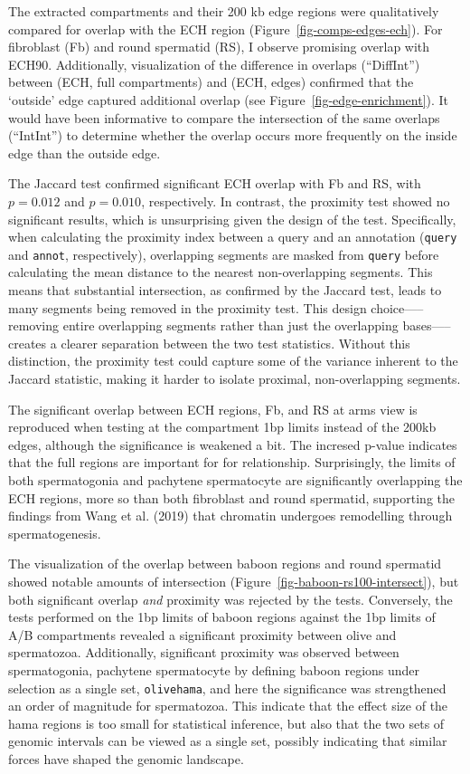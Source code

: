 \documentclass[
  11pt,
  a4paper,
]{scrbook}
\begin{document}
The extracted compartments and their 200 kb edge regions were
qualitatively compared for overlap with the ECH region
(Figure~\ref{fig-comps-edges-ech}). For fibroblast (Fb) and round
spermatid (RS), I observe promising overlap with ECH90. Additionally,
visualization of the difference in overlaps (``DiffInt'') between (ECH,
full compartments) and (ECH, edges) confirmed that the `outside' edge
captured additional overlap (see Figure~\ref{fig-edge-enrichment}). It
would have been informative to compare the intersection of the same
overlaps (``IntInt'') to determine whether the overlap occurs more
frequently on the inside edge than the outside edge.

The Jaccard test confirmed significant ECH overlap with Fb and RS, with
\(p=0.012\) and \(p=0.010\), respectively. In contrast, the proximity
test showed no significant results, which is unsurprising given the
design of the test. Specifically, when calculating the proximity index
between a query and an annotation (\texttt{query} and \texttt{annot},
respectively), overlapping segments are masked from \texttt{query}
before calculating the mean distance to the nearest non-overlapping
segments. This means that substantial intersection, as confirmed by the
Jaccard test, leads to many segments being removed in the proximity
test. This design choice-----removing entire overlapping segments rather
than just the overlapping bases-----creates a clearer separation between
the two test statistics. Without this distinction, the proximity test
could capture some of the variance inherent to the Jaccard statistic,
making it harder to isolate proximal, non-overlapping segments.

The significant overlap between ECH regions, Fb, and RS at arms view is
reproduced when testing at the compartment 1bp limits instead of the
200kb edges, although the significance is weakened a bit. The incresed
p-value indicates that the full regions are important for for
relationship. Surprisingly, the limits of both spermatogonia and
pachytene spermatocyte are significantly overlapping the ECH regions,
more so than both fibroblast and round spermatid, supporting the
findings from Wang et al. (2019) that chromatin undergoes remodelling
through spermatogenesis.

The visualization of the overlap between baboon regions and round
spermatid showed notable amounts of intersection
(Figure~\ref{fig-baboon-rs100-intersect}), but both significant overlap
\emph{and} proximity was rejected by the tests. Conversely, the tests
performed on the 1bp limits of baboon regions against the 1bp limits of
A/B compartments revealed a significant proximity between olive and
spermatozoa. Additionally, significant proximity was observed between
spermatogonia, pachytene spermatocyte by defining baboon regions under
selection as a single set, \texttt{olivehama}, and here the significance
was strengthened an order of magnitude for spermatozoa. This indicate
that the effect size of the hama regions is too small for statistical
inference, but also that the two sets of genomic intervals can be viewed
as a single set, possibly indicating that similar forces have shaped the
genomic landscape.
\end{document}
